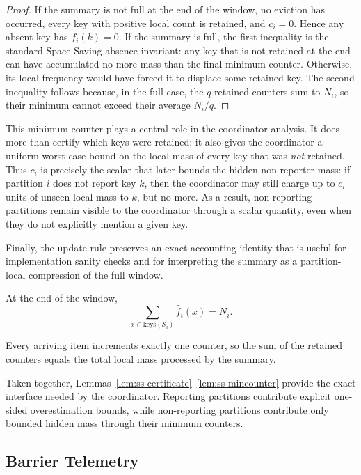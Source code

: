 \documentclass[sigconf, nonacm]{acmart}
\begin{document}
\begin{proof}
If the summary is not full at the end of the window, no eviction has occurred, every key with positive local count is retained, and \(c_i=0\). Hence any absent key has \(f_i(k)=0\). If the summary is full, the first inequality is the standard Space-Saving absence invariant: any key that is not retained at the end can have accumulated no more mass than the final minimum counter. Otherwise, its local frequency would have forced it to displace some retained key. The second inequality follows because, in the full case, the \(q\) retained counters sum to \(N_i\), so their minimum cannot exceed their average \(N_i/q\).
\end{proof}

This minimum counter plays a central role in the coordinator analysis. It does more than certify which keys were retained; it also gives the coordinator a uniform worst-case bound on the local mass of every key that was \emph{not} retained. Thus \(c_i\) is precisely the scalar that later bounds the hidden non-reporter mass: if partition \(i\) does not report key \(k\), then the coordinator may still charge up to \(c_i\) units of unseen local mass to \(k\), but no more. As a result, non-reporting partitions remain visible to the coordinator through a scalar quantity, even when they do not explicitly mention a given key.

Finally, the update rule preserves an exact accounting identity that is useful for implementation sanity checks and for interpreting the summary as a partition-local compression of the full window.

\begin{lemma}
\label{lem:ss-sum}
At the end of the window,
\[
\sum_{x \in \mathrm{keys}(\mathcal{S}_i)} \hat f_i(x) = N_i.
\]
\end{lemma}

Every arriving item increments exactly one counter, so the sum of the retained counters equals the total local mass processed by the summary.

Taken together, Lemmas~\ref{lem:ss-certificate}--\ref{lem:ss-mincounter} provide the exact interface needed by the coordinator. Reporting partitions contribute explicit one-sided overestimation bounds, while non-reporting partitions contribute only bounded hidden mass through their minimum counters.

\subsection{Barrier Telemetry}
\label{subsec:ss-telemetry}
\end{document}
